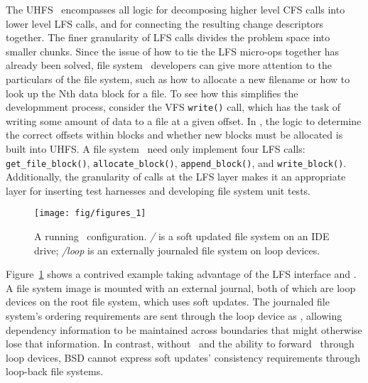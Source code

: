 The UHFS \module\ encompasses all logic for decomposing higher level CFS calls
into lower level LFS calls, and for connecting the resulting change descriptors
together. The finer granularity of LFS calls divides the problem space into
smaller chunks. Since the issue of how to tie the LFS micro-ops together has
already been solved, file system \module\ developers can give more attention to
the particulars of the file system, such as how to allocate a new filename or
how to look up the Nth data block for a file. To see how this simplifies the
developmment process, consider the VFS \texttt{write()} call, which has the task
of writing some amount of data to a file at a given offset. In \Kudos, the logic
to determine the correct offsets within blocks and whether new blocks must be
allocated is built into UHFS. A file system \module\ need only implement four
LFS calls: \texttt{get\_file\_block()}, \texttt{allocate\_block()},
\texttt{append\_block()}, and \texttt{write\_block()}. Additionally, the
granularity of calls at the LFS layer makes it an appropriate layer for
inserting test harnesses and developing file system unit tests.

\begin{figure}[tb]
  \centering
  \texttt{[image: fig/figures\_1]}
  \caption{A running \Kudos\ configuration. {\it/} is a soft updated
    file system on an IDE drive; {\it/loop} is an externally journaled
    file system on loop devices.}
  \label{fig:kfs-graph}
\end{figure}

Figure~\ref{fig:kfs-graph} shows a contrived example taking advantage of the LFS
interface and \chdescs. A file system image is mounted with an external journal,
both of which are loop devices on the root file system, which uses soft updates.
The journaled file system's ordering requirements are sent through the loop
device as \chdescs, allowing dependency information to be maintained across
boundaries that might otherwise lose that information. In contrast, without
\chdescs\ and the ability to forward \chdescs\ through loop devices, BSD cannot
express soft updates' consistency requirements through loop-back file systems.
